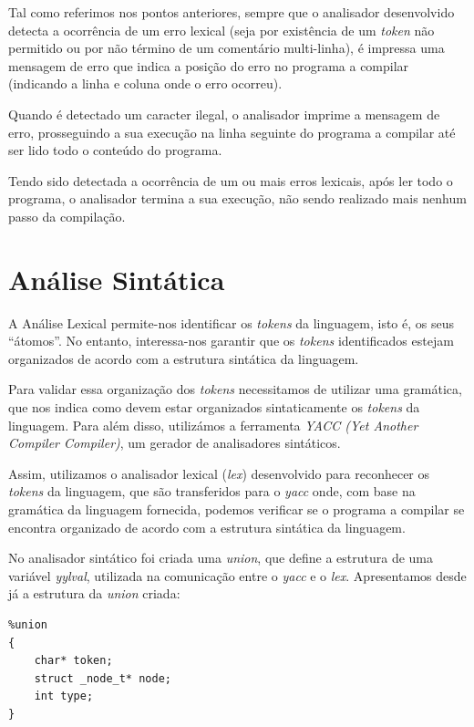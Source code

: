 \documentclass[11pt,a4paper]{article}
\begin{document}
	Tal como referimos nos pontos anteriores, sempre que o analisador desenvolvido detecta a ocorrência de um erro lexical (seja por existência de um \emph{token} não permitido ou por não término de um comentário multi-linha), é impressa uma mensagem de erro que indica a posição do erro no programa a compilar (indicando a linha e coluna onde o erro ocorreu).
	
	Quando é detectado um caracter ilegal, o analisador imprime a mensagem de erro, prosseguindo a sua execução na linha seguinte do programa a compilar até ser lido todo o conteúdo do programa.
	
	Tendo sido detectada a ocorrência de um ou mais erros lexicais, após ler todo o programa, o analisador termina a sua execução, não sendo realizado mais nenhum passo da compilação.


\pagebreak

\section{Análise Sintática}

A Análise Lexical permite-nos identificar os \emph{tokens} da linguagem, isto é, os seus ``átomos''. No entanto, interessa-nos garantir que os \emph{tokens} identificados estejam organizados de acordo com a estrutura sintática da linguagem.

Para validar essa organização dos \emph{tokens} necessitamos de utilizar uma gramática, que nos indica como devem estar organizados sintaticamente os \emph{tokens} da linguagem. Para além disso, utilizámos a ferramenta \emph{YACC (Yet Another Compiler Compiler)}, um gerador de analisadores sintáticos.

Assim, utilizamos o analisador lexical (\emph{lex}) desenvolvido para reconhecer os \emph{tokens} da linguagem, que são transferidos para o \emph{yacc} onde, com base na gramática da linguagem fornecida, podemos verificar se o programa a compilar se encontra organizado de acordo com a estrutura sintática da linguagem.

No analisador sintático foi criada uma \emph{union}, que define a estrutura de uma variável \emph{yylval}, utilizada na comunicação entre o \emph{yacc} e o \emph{lex}. Apresentamos desde já a estrutura da \emph{union} criada:

\begin{lstlisting}
%union
{
    char* token;    
    struct _node_t* node;
    int type;
}
\end{lstlisting}
\end{document}
